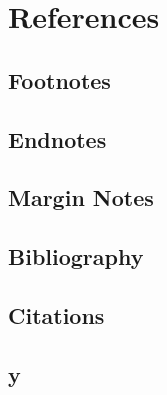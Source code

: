 	
	\section{References}
	\label{References}

	\subsection{Footnotes}
	\label{Footnotes}


	\subsection{Endnotes}
	\label{Endnotes}


	\subsection{Margin Notes}
	\label{Margin Notes}


	\subsection{Bibliography}
	\label{Bibliography}


	\subsection{Citations}
	\label{Citations}


	\subsection{y}
	\label{y}

